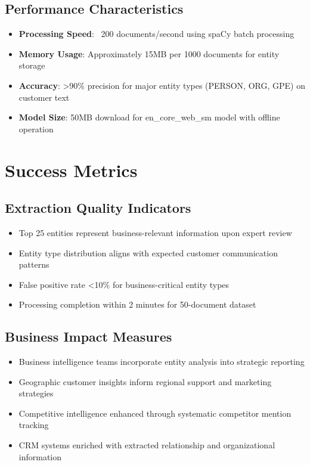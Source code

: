 \documentclass[11pt]{article}
\begin{document}
\subsection{Performance Characteristics}
\begin{itemize}
\item \textbf{Processing Speed}: ~200 documents/second using spaCy batch processing
\item \textbf{Memory Usage}: Approximately 15MB per 1000 documents for entity storage
\item \textbf{Accuracy}: >90\% precision for major entity types (PERSON, ORG, GPE) on customer text
\item \textbf{Model Size}: 50MB download for en\_core\_web\_sm model with offline operation
\end{itemize}

\section{Success Metrics}

\subsection{Extraction Quality Indicators}
\begin{itemize}
\item Top 25 entities represent business-relevant information upon expert review
\item Entity type distribution aligns with expected customer communication patterns
\item False positive rate <10\% for business-critical entity types
\item Processing completion within 2 minutes for 50-document dataset
\end{itemize}

\subsection{Business Impact Measures}
\begin{itemize}
\item Business intelligence teams incorporate entity analysis into strategic reporting
\item Geographic customer insights inform regional support and marketing strategies
\item Competitive intelligence enhanced through systematic competitor mention tracking
\item CRM systems enriched with extracted relationship and organizational information
\end{itemize}
\end{document}
